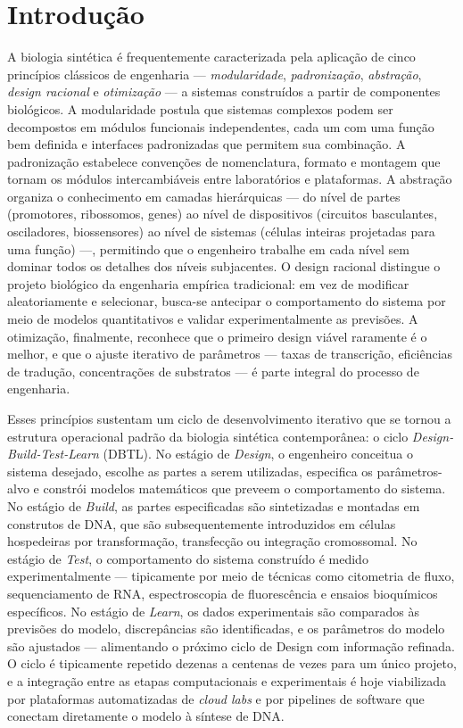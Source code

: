 \section{Introdução}
\label{sec:14-introducao}

A biologia sintética é frequentemente caracterizada pela aplicação de cinco princípios clássicos de engenharia --- \emph{modularidade}, \emph{padronização}, \emph{abstração}, \emph{design racional} e \emph{otimização} --- a sistemas construídos a partir de componentes biológicos. A modularidade postula que sistemas complexos podem ser decompostos em módulos funcionais independentes, cada um com uma função bem definida e interfaces padronizadas que permitem sua combinação. A padronização estabelece convenções de nomenclatura, formato e montagem que tornam os módulos intercambiáveis entre laboratórios e plataformas. A abstração organiza o conhecimento em camadas hierárquicas --- do nível de partes (promotores, ribossomos, genes) ao nível de dispositivos (circuitos basculantes, osciladores, biossensores) ao nível de sistemas (células inteiras projetadas para uma função) ---, permitindo que o engenheiro trabalhe em cada nível sem dominar todos os detalhes dos níveis subjacentes. O design racional distingue o projeto biológico da engenharia empírica tradicional: em vez de modificar aleatoriamente e selecionar, busca-se antecipar o comportamento do sistema por meio de modelos quantitativos e validar experimentalmente as previsões. A otimização, finalmente, reconhece que o primeiro design viável raramente é o melhor, e que o ajuste iterativo de parâmetros --- taxas de transcrição, eficiências de tradução, concentrações de substratos --- é parte integral do processo de engenharia.

Esses princípios sustentam um ciclo de desenvolvimento iterativo que se tornou a estrutura operacional padrão da biologia sintética contemporânea: o ciclo \emph{Design-Build-Test-Learn} (DBTL). No estágio de \emph{Design}, o engenheiro conceitua o sistema desejado, escolhe as partes a serem utilizadas, especifica os parâmetros-alvo e constrói modelos matemáticos que preveem o comportamento do sistema. No estágio de \emph{Build}, as partes especificadas são sintetizadas e montadas em construtos de DNA, que são subsequentemente introduzidos em células hospedeiras por transformação, transfecção ou integração cromossomal. No estágio de \emph{Test}, o comportamento do sistema construído é medido experimentalmente --- tipicamente por meio de técnicas como citometria de fluxo, sequenciamento de RNA, espectroscopia de fluorescência e ensaios bioquímicos específicos. No estágio de \emph{Learn}, os dados experimentais são comparados às previsões do modelo, discrepâncias são identificadas, e os parâmetros do modelo são ajustados --- alimentando o próximo ciclo de Design com informação refinada. O ciclo é tipicamente repetido dezenas a centenas de vezes para um único projeto, e a integração entre as etapas computacionais e experimentais é hoje viabilizada por plataformas automatizadas de \emph{cloud labs} e por pipelines de software que conectam diretamente o modelo à síntese de DNA.

